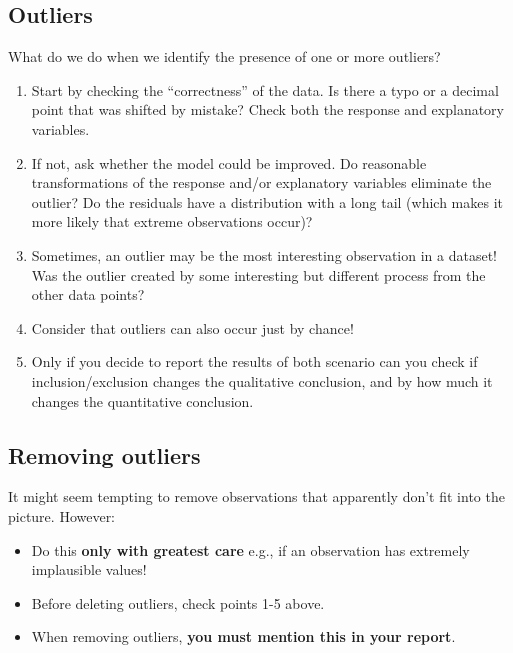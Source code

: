 \documentclass[
  letterpaper,
  8pt,
  a4paper]{book}
\providecommand{\tightlist}{%
  \setlength{\itemsep}{0pt}\setlength{\parskip}{0pt}}
\begin{document}
\subsection*{Outliers}\label{outliers}

What do we do when we identify the presence of one or more outliers?

\begin{enumerate}
\def\labelenumi{\arabic{enumi}.}
\tightlist
\item
  Start by checking the ``correctness'' of the data. Is there a typo or
  a decimal point that was shifted by mistake? Check both the response
  and explanatory variables.
\item
  If not, ask whether the model could be improved. Do reasonable
  transformations of the response and/or explanatory variables eliminate
  the outlier? Do the residuals have a distribution with a long tail
  (which makes it more likely that extreme observations occur)?
\item
  Sometimes, an outlier may be the most interesting observation in a
  dataset! Was the outlier created by some interesting but different
  process from the other data points?
\item
  Consider that outliers can also occur just by chance!
\item
  Only if you decide to report the results of both scenario can you
  check if inclusion/exclusion changes the qualitative conclusion, and
  by how much it changes the quantitative conclusion.
\end{enumerate}

\subsection*{Removing outliers}\label{removing-outliers}

It might seem tempting to remove observations that apparently don't fit
into the picture. However:

\begin{itemize}
\tightlist
\item
  Do this \textbf{only with greatest care} e.g., if an observation has
  extremely implausible values!\\
\item
  Before deleting outliers, check points 1-5 above.
\item
  When removing outliers, \textbf{you must mention this in your report}.
\end{itemize}
\end{document}
